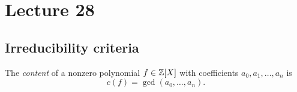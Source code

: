 \section{Lecture 28}
\subsection{Irreducibility criteria}

\begin{definition}
    The \emph{content} of a nonzero polynomial $f \in \mathbb Z[X]$ with coefficients $a_0, a_1, \ldots, a_n$ is
    $$
    c(f)=\gcd(a_0, \ldots, a_n).
    $$
\end{definition}

